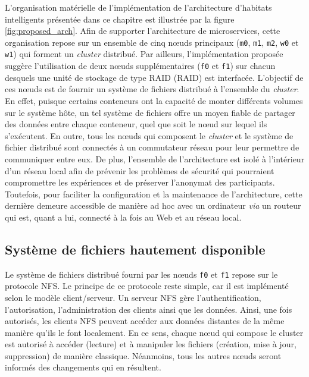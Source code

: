 L'organisation matérielle de l'implémentation de l'architecture d'habitats intelligents présentée dans ce chapitre est illustrée par la figure \ref{fig:proposed_arch}. Afin de supporter l'architecture de microservices, cette organisation repose sur un ensemble de cinq n\oe{}uds principaux (\texttt{m0}, \texttt{m1}, \texttt{m2}, \texttt{w0} et \texttt{w1}) qui forment un \textit{cluster} distribué. Par ailleurs, l'implémentation proposée suggère l'utilisation de deux n\oe{}uds supplémentaires (\texttt{f0} et \texttt{f1}) sur chacun desquels une unité de stockage de type \acs{RAID} (\acl{RAID}) est interfacée. L'objectif de ces n\oe{}uds est de fournir un système de fichiers distribué à l'ensemble du \textit{cluster}. En effet, puisque certains conteneurs ont la capacité de monter différents volumes sur le système hôte, un tel système de fichiers offre un moyen fiable de partager des données entre chaque conteneur, quel que soit le n\oe{}ud sur lequel ils s'exécutent. En outre, tous les n\oe{}uds qui composent le \textit{cluster} et le système de fichier distribué sont connectés à un commutateur réseau pour leur permettre de communiquer entre eux. De plus, l'ensemble de l'architecture est isolé à l'intérieur d'un réseau local afin de prévenir les problèmes de sécurité qui pourraient compromettre les expériences et de préserver l'anonymat des participants. Toutefois, pour faciliter la configuration et la maintenance de l'architecture, cette dernière demeure accessible de manière ad hoc avec un ordinateur \textit{via} un routeur qui est, quant a lui, connecté à la fois au Web et au réseau local.

\subsection{Système de fichiers hautement disponible}

Le système de fichiers distribué fourni par les n\oe{}uds \texttt{f0} et \texttt{f1} repose sur le protocole \ac{NFS}. Le principe de ce protocole reste simple, car il est implémenté selon le modèle client/serveur. Un serveur \acs{NFS} gère l'authentification, l'autorisation, l'administration des clients ainsi que les données. Ainsi, une fois autorisés, les clients NFS peuvent accéder aux données distantes de la même manière qu'ils le font localement. En ce sens, chaque n\oe{}ud qui compose le cluster est autorisé à accéder (lecture) et à manipuler les fichiers (création, mise à jour, suppression) de manière classique. Néanmoins, tous les autres n\oe{}uds seront informés des changements qui en résultent.

